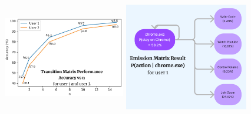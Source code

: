 \documentclass[final]{beamer}
\newlength{\colwidth}
\begin{document}
\begin{frame}[t]
\begin{columns}[t]
\begin{column}{\colwidth}
\begin{block}
      \begin{figure}
        \includegraphics[width=0.475\textwidth, height=15cm]{transition-mt.jpeg}
        \hspace{\fill}
        \includegraphics[width=0.48\textwidth, height=15cm]{emission-mt.jpeg}
        \end{figure}



\end{block}
\end{column}
\end{columns}
\end{frame}
\end{document}
